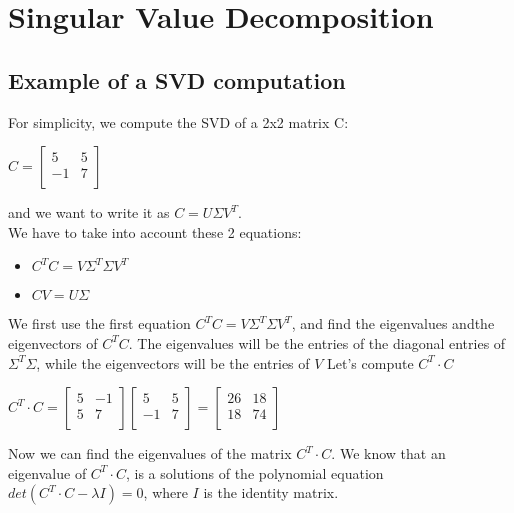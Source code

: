 \chapter{Singular Value Decomposition}
\section{Example of a SVD computation}

For simplicity, we compute the SVD of a 2x2 matrix C:
\begin{center}
	$ 
	C=\begin{bmatrix}
	5 &   5 \\
-1  &  7 \\
	\end{bmatrix}$
\end{center}
and we want to write it as $ C=U\Sigma V^{T} $.\\
We have to take into account these 2 equations:
\begin{itemize}
	\item $ C^T C = V\Sigma^T\Sigma V^T$
	\item $CV=U\Sigma$
\end{itemize}
We first use the first equation  $ C^T C = V\Sigma^T\Sigma V^T$, and find the eigenvalues andthe eigenvectors of $C^T C $.
The eigenvalues will be the entries of the diagonal entries of $ \Sigma^T\Sigma $, while the eigenvectors will be the entries of $ V $
Let's compute $ C^T \cdot C $\\
\begin{center}
	$ C^T \cdot C =\begin{bmatrix}
5 &   -1 \\
5  &  7 \\
\end{bmatrix}\begin{bmatrix}
5 &   5 \\
-1  &  7 \\
\end{bmatrix}=\begin{bmatrix}
26 &   18 \\
18  &  74 \\
\end{bmatrix}$\\
\end{center}
Now we can find the eigenvalues of the matrix $ C^T \cdot C $.
We know that an eigenvalue of $ C^T \cdot C $, is a solutions of the polynomial equation $det( C^T \cdot C-\lambda I)=0 $, where $ I $ is the identity matrix.\\
